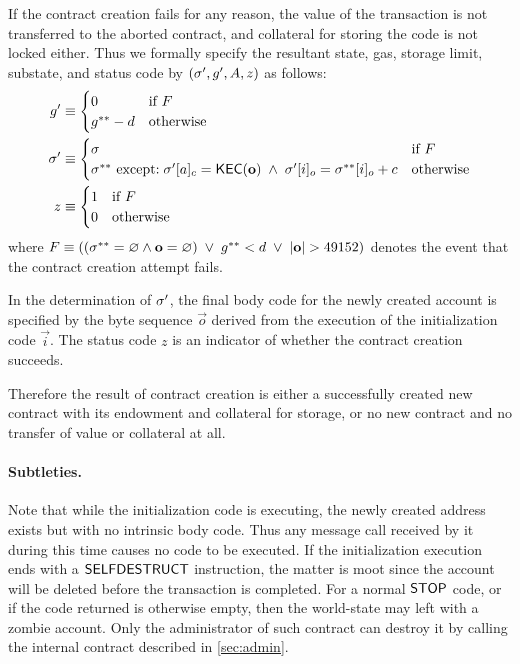 If the contract creation fails for any reason, the value of the transaction is not transferred to the aborted contract, and collateral for storing the code is not locked either.
Thus we formally specify the resultant state, gas, storage limit, substate, and status code by $\left(\mathbf{\sigma}', g', A, z\right)$ as follows:
\begin{align}
	g' &\equiv \begin{cases}
		0 & \mbox{if $F$}\\
		g^{**}-d & \mbox{otherwise}
	\end{cases} \\
	\mathbf{\sigma}' &\equiv 
	\begin{cases}
		\mathbf{\sigma} 	 	& \mbox{if $F$}\\
		\mathbf{\sigma}^{**} 	\mbox{ except:} 
		\; \mathbf{\sigma}'[a]_c = \mathsf{KEC}(\mathbf{o})\;\land\; \mathbf{\sigma}'[i]_o=\mathbf{\sigma}^{**}[i]_o+c& \mbox{otherwise}
	\end{cases}\\
	z &\equiv 
	\begin{cases}
		1	 	& \mbox{if $F$}\\
		0	 	& \mbox{otherwise}
	\end{cases}
\end{align}
where $F\eqdef\left( \left(\st^{**}=\varnothing \land \vec{o}=\varnothing \right)\;\lor\; g^{**}<d \;\lor\;|{\bf o}|>49152 \right)$
denotes the event that the contract creation attempt fails.

In the determination of $\mathbf{\sigma}'$, the final body code for the newly created account is specified by the byte sequence $\vec{o}$ derived from the execution of the initialization code $\vec{i}$.
The status code $z$ is an indicator of whether the contract creation succeeds.

Therefore the result of contract creation is either a successfully created new contract with its endowment and collateral for storage, or no new contract and no transfer of value or collateral at all.

\paragraph{Subtleties.} 
Note that while the initialization code is executing, the newly created address exists but with no intrinsic body code. 
Thus any message call received by it during this time causes no code to be executed. 
If the initialization execution ends with a $\mathsf{SELFDESTRUCT}$ instruction, the matter is moot since the account will be deleted before the transaction is completed. 
For a normal $\mathsf{STOP}$ code, or if the code returned is otherwise empty, then the world-state may left with a zombie account. Only the administrator of such contract can destroy it by calling the internal contract described in \cref{sec:admin}.




